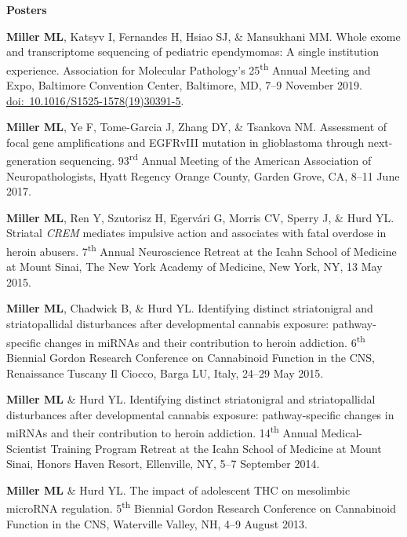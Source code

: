 \documentclass[10pt]{article}
\begin{document}
\begin{description}
\item \textbf{Posters}

\item[\quad] \textbf{Miller ML}, Katsyv I, Fernandes H, Hsiao SJ, \& Mansukhani MM. Whole exome and transcriptome sequencing of pediatric ependymomas: A single institution experience. Association for Molecular Pathology's 25\textsuperscript{th} Annual Meeting and Expo, Baltimore Convention Center, Baltimore, MD, 7--9 November 2019. \href{https://doi.org/10.1016/S1525-1578(19)30391-5}{doi:~10.1016/S1525-1578(19)30391-5}.

\item[\quad] \textbf{Miller ML}, Ye F, Tome-Garcia J, Zhang DY, \& Tsankova NM. Assessment of focal gene amplifications and EGFRvIII mutation in glioblastoma through next-generation sequencing. 93\textsuperscript{rd} Annual Meeting of the American Association of Neuropathologists, Hyatt Regency Orange County, Garden Grove, CA, 8--11 June 2017.

\item[\quad] \textbf{Miller ML}, Ren Y, Szutorisz H, Egervári G, Morris CV, Sperry J, \& Hurd YL. Striatal \textit{CREM} mediates impulsive action and associates with fatal overdose in heroin abusers. 7\textsuperscript{th} Annual Neuroscience Retreat at the Icahn School of Medicine at Mount Sinai, The New York Academy of Medicine, New York, NY, 13 May 2015.

\item[\quad] \textbf{Miller ML}, Chadwick B, \& Hurd YL. Identifying distinct striatonigral and striatopallidal disturbances after developmental cannabis exposure: pathway-specific changes in miRNAs and their contribution to heroin addiction. 6\textsuperscript{th} Biennial Gordon Research Conference on Cannabinoid Function in the CNS, Renaissance Tuscany Il Ciocco, Barga LU, Italy, 24--29 May 2015.

\item[\quad] \textbf{Miller ML} \& Hurd YL. Identifying distinct striatonigral and striatopallidal disturbances after developmental cannabis exposure: pathway-specific changes in miRNAs and their contribution to heroin addiction. 14\textsuperscript{th} Annual Medical-Scientist Training Program Retreat at the Icahn School of Medicine at Mount Sinai, Honors Haven Resort, Ellenville, NY, 5--7 September 2014.

\item[\quad] \textbf{Miller ML} \& Hurd YL. The impact of adolescent THC on mesolimbic microRNA regulation. 5\textsuperscript{th} Biennial Gordon Research Conference on Cannabinoid Function in the CNS, Waterville Valley, NH, 4--9 August 2013.
\end{description}
\end{document}
